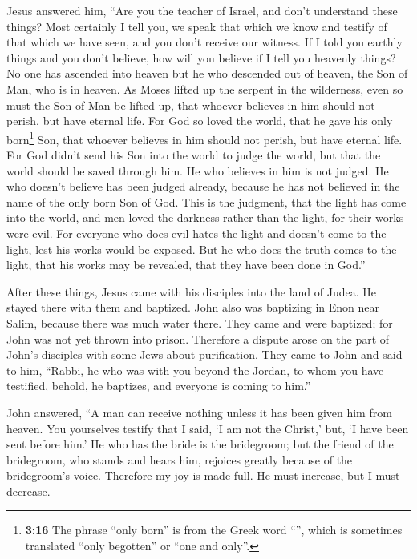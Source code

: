  Jesus answered him, ``Are you the teacher of Israel, and
don't understand these things?  Most certainly I tell
you, we speak that which we know and testify of that which we have seen,
and you don't receive our witness.  If I told you earthly
things and you don't believe, how will you believe if I tell you
heavenly things?  No one has ascended into heaven but he
who descended out of heaven, the Son of Man, who is in heaven.
 As Moses lifted up the serpent in the wilderness, even
so must the Son of Man be lifted up,  that whoever
believes in him should not perish, but have eternal life.
 For God so loved the world, that he gave his only
born\footnote{\textbf{3:16} The phrase ``only born'' is from the Greek
  word ``'', which is sometimes translated ``only
  begotten'' or ``one and only''.} Son, that whoever believes in him
should not perish, but have eternal life.  For God didn't
send his Son into the world to judge the world, but that the world
should be saved through him.  He who believes in him is
not judged. He who doesn't believe has been judged already, because he
has not believed in the name of the only born Son of God.
 This is the judgment, that the light has come into the
world, and men loved the darkness rather than the light, for their works
were evil.  For everyone who does evil hates the light
and doesn't come to the light, lest his works would be exposed.
 But he who does the truth comes to the light, that his
works may be revealed, that they have been done in God.''

 After these things, Jesus came with his disciples into
the land of Judea. He stayed there with them and baptized.
 John also was baptizing in Enon near Salim, because
there was much water there. They came and were baptized; 
for John was not yet thrown into prison.  Therefore a
dispute arose on the part of John's disciples with some Jews about
purification.  They came to John and said to him,
``Rabbi, he who was with you beyond the Jordan, to whom you have
testified, behold, he baptizes, and everyone is coming to him.''

 John answered, ``A man can receive nothing unless it has
been given him from heaven.  You yourselves testify that
I said, `I am not the Christ,' but, `I have been sent before him.'
 He who has the bride is the bridegroom; but the friend
of the bridegroom, who stands and hears him, rejoices greatly because of
the bridegroom's voice. Therefore my joy is made full. 
He must increase, but I must decrease.

